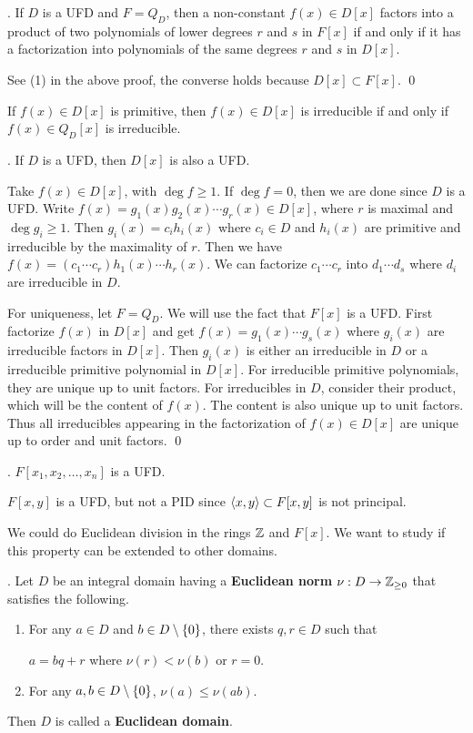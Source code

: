 \cor. If \(D\) is a UFD and \(F = Q_D\), then a non-constant \(f(x) \in D[x]\) factors into a product of two polynomials of lower degrees \(r\) and \(s\) in \(F[x]\) if and only if it has a factorization into polynomials of the same degrees \(r\) and \(s\) in \(D[x]\).

\pf See (1) in the above proof, the converse holds because \(D[x] \subset F[x]\). \qed

\rmk If \(f(x) \in D[x]\) is primitive, then \(f(x) \in D[x]\) is irreducible if and only if \(f(x) \in Q_D[x]\) is irreducible.

\thm. If \(D\) is a UFD, then \(D[x]\) is also a UFD.

\pf Take \(f(x) \in D[x]\), with \(\deg f \geq 1\). If \(\deg f = 0\), then we are done since \(D\) is a UFD. Write \(f(x) = g_1(x) g_2(x) \cdots g_r(x) \in D[x]\), where \(r\) is maximal and \(\deg g_i \geq 1\). Then \(g_i(x) = c_ih_i(x)\) where \(c_i \in D\) and \(h_i(x)\) are primitive and irreducible by the maximality of \(r\). Then we have \(f(x) = (c_1 \cdots c_r)h_1(x) \cdots h_r(x)\). We can factorize \(c_1 \cdots c_r\) into \(d_1 \cdots d_s\) where \(d_i\) are irreducible in \(D\).

For uniqueness, let \(F = Q_D\). We will use the fact that \(F[x]\) is a UFD. First factorize \(f(x)\) in \(D[x]\) and get \(f(x) = g_1(x) \cdots g_s(x)\) where \(g_i(x)\) are irreducible factors in \(D[x]\). Then \(g_i(x)\) is either an irreducible in \(D\) or a irreducible primitive polynomial in \(D[x]\). For irreducible primitive polynomials, they are unique up to unit factors. For irreducibles in \(D\), consider their product, which will be the content of \(f(x)\). The content is also unique up to unit factors. Thus all irreducibles appearing in the factorization of \(f(x) \in D[x]\) are unique up to order and unit factors. \qed

\cor. \(F[x_1, x_2, \dots, x_n]\) is a UFD.

\rmk \(F[x, y]\) is a UFD, but not a PID since \(\left\langle x, y \right\rangle \subset F[x, y]\) is not principal.

\pagebreak


We could do Euclidean division in the rings \(\mathbb{Z}\) and \(F[x]\). We want to study if this property can be extended to other domains.

.  Let \(D\) be an integral domain having a \textbf{Euclidean norm} \(\nu : D \rightarrow \mathbb{Z}_{\geq 0}\) that satisfies the following.
\begin{enumerate}
    \item For any \(a \in D\) and \(b \in D \setminus \{0\}\), there exists \(q, r \in D\) such that
    \begin{center}
        \(a = bq + r\) \quad where \quad \(\nu(r) < \nu(b)\) or \(r = 0\).
    \end{center}
    \item For any \(a, b \in D \setminus \{0\}\), \(\nu(a) \leq \nu(ab)\).
\end{enumerate}
Then \(D\) is called a \textbf{Euclidean domain}.

